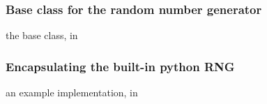 \begin{frame}[fragile]
%
  \frametitle{Base class for the random number generator}
%
  the base class, in 
%
%
\end{frame}

\begin{frame}[fragile]
%
  \frametitle{Encapsulating the built-in python RNG}
%
  an example implementation, in 
%
%
\end{frame}

